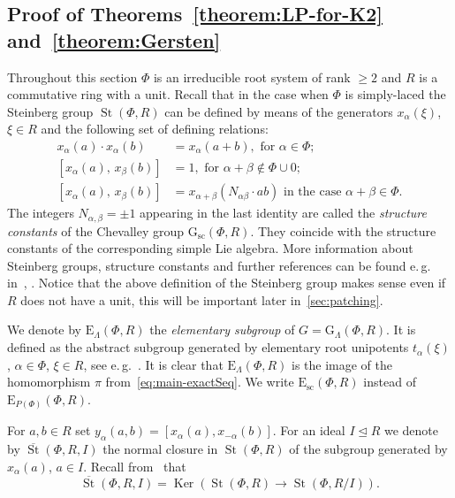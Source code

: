 \documentclass[oneside, 11pt]{amsart}
\numberwithin{equation}{section}
\newcommand{\Ker}{\mathop{\mathrm{Ker}}\nolimits}
\newcommand{\St}{\mathop{\mathrm{St}}\nolimits}
\newcommand{\E}{\mathrm{E}}
\theoremstyle{definition}
\theoremstyle{definition}
\theoremstyle{remark}
\begin{document}
\subsection{Proof of Theorems~\ref{theorem:LP-for-K2} and~\ref{theorem:Gersten}}
Throughout this section $\Phi$ is an irreducible root system of rank $\geq 2$ and $R$ is a commutative ring with a unit. Recall that in the case when $\Phi$ is simply-laced the Steinberg group $\St(\Phi, R)$ can be defined by means of the generators $x_\alpha(\xi)$, $\xi \in R$ and the following set of defining relations:
\begin{align}
x_{\alpha}(a)\cdot x_{\alpha}(b)&=x_{\alpha}(a+b),\text{ for } \alpha\in \Phi;\tag{R1} \label{R1}\\
[x_{\alpha}(a),\,x_{\beta}(b)]  &=1,\text{ for }\alpha+\beta\not\in\Phi\cup 0; \tag{R2} \label{R2} \\
[x_{\alpha}(a),\,x_{\beta}(b)]  &=x_{\alpha+\beta}(N_{\alpha\beta} \cdot ab)\text{ in the case }\alpha+\beta\in\Phi. \tag{R3} \label{R3} \end{align}
The integers $N_{\alpha,\beta} = \pm 1$ appearing in the last identity are called the {\it structure constants} of the Chevalley group $\mathrm{G}_\mathrm{sc}(\Phi, R)$. They coincide with the structure constants of the corresponding simple Lie algebra. More information about Steinberg groups, structure constants and further references can be found e.\,g. in~\cite[\S~3]{St71}, \cite[\S~2.4]{LSV20}. Notice that the above definition of the Steinberg group makes sense even if $R$ does not have a unit, this will be important later in~\cref{sec:patching}.

We denote by $\E_\Lambda(\Phi, R)$ the {\it elementary subgroup} of $G = \mathrm{G}_\Lambda(\Phi, R)$. It is defined as the abstract subgroup generated by elementary root unipotents $t_\alpha(\xi)$, $\alpha \in \Phi$, $\xi \in R$, see e.\,g.~\cite{St71, St78, VZ20, Abe83}. It is clear that $\E_\Lambda(\Phi, R)$ is the image of the homomorphism $\pi$ from~\eqref{eq:main-exactSeq}. We write $\E_\mathrm{sc}(\Phi, R)$ instead of $\E_{P(\Phi)}(\Phi, R)$.

For $a, b \in R$ set $y_\alpha(a, b) = [x_\alpha(a), x_{-\alpha}(b)]$.
For an ideal $I \trianglelefteq R$ we denote by $\overline{\St}(\Phi, R, I)$ the normal closure in $\St(\Phi, R)$ of the subgroup generated by $x_\alpha(a)$, $a\in I$. Recall from~\cite[Lemma~5]{S15} that
\begin{equation} \label{eq:relative-st-ker}
 \overline{\St}(\Phi, R, I) = \Ker(\St(\Phi, R) \to \St(\Phi, R/I)).
\end{equation}
\end{document}
